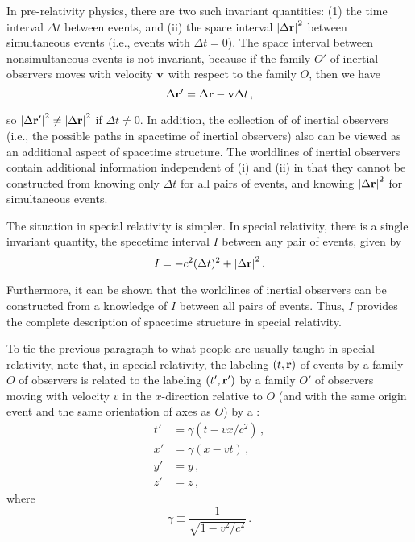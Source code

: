 In pre-relativity physics, there are two such invariant quantities: (1) the time interval $\Delta t$ between events, and (ii) the space interval $\abs{\Delta{\vb{r}}}^2$ between simultaneous events (i.e., events with $\Delta t = 0$). The space interval between nonsimultaneous events is not invariant, because if the family $O'$ of inertial observers moves with velocity $\vb{v}$ with respect to the family $O$, then we have 
\begin{equation}\label{eq:Wald_08.1}
\Delta \vb{r}' = \Delta \vb{r} - \vb{v} \Delta t \,,
\end{equation}

so $\abs{\Delta{\vb{r}'}}^2 \neq \abs{\Delta{\vb{r}}}^2$ if $\Delta t \neq 0$. In addition, the collection of  of inertial observers (i.e., the possible paths in spacetime of inertial observers) also can be viewed as an additional aspect of spacetime structure. The worldlines of inertial observers contain additional information independent of (i) and (ii) in that they cannot be constructed from knowing only $\Delta t$ for all pairs of events, and knowing $\abs{\Delta{\vb{r}}}^2$ for simultaneous events. 

The situation in special relativity is simpler. In special relativity, there is a single invariant quantity, the specetime interval $I$ between any pair of events, given by
\begin{equation}\label{eq:Wald_08.2}
I = - c^2 (\Delta t)^2 + \abs{\Delta{\vb{r}}}^ 2\,.
\end{equation}

Furthermore, it can be shown that the worldlines of inertial observers can be constructed from a knowledge of $I$ between all pairs of events. Thus, $I$ provides the complete description of spacetime structure in special relativity.

To tie the previous paragraph to what people are usually taught in special relativity, note that, in special relativity, the labeling $(t, \vb{r})$ of events by a family $O$ of observers is related to the labeling $(t', \vb{r}')$ by a family $O'$ of observers moving with velocity $v$ in the $x$-direction relative to $O$ (and with the same origin event and the same orientation of axes as $O$) by a :
\begin{equation}\label{eq:Wald_08.3}
\begin{aligned}
t' &= \gamma (t - vx/c^2)\,,\\
x' &= \gamma (x - v t)\,,\\
y' &= y\,,\\
z' &= z\,,
\end{aligned}
\end{equation}
where 
\begin{equation}\label{eq:Wald_08.4}
\gamma \equiv \frac{1}{\sqrt{1 - v^2/c^2}}\,.
\end{equation}

